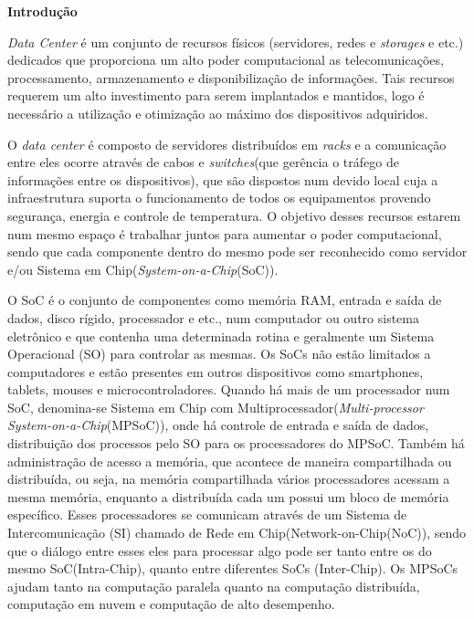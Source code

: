 \documentclass[a4paper,12pt]{article}
\begin{document}
\begin{center}
\textbf{{\LARGE Introdução}} \\ \vspace{0.5cm}
\end{center}

\textit{Data Center} é um conjunto de recursos físicos (servidores, redes e \textit{storages} e etc.) dedicados que proporciona um alto poder computacional as telecomunicações, processamento, armazenamento e disponibilização de informações. Tais recursos requerem um alto investimento para serem implantados e mantidos, logo é necessário a utilização e otimização ao máximo dos dispositivos adquiridos.

O \textit{data center} é composto de servidores distribuídos em \textit{racks} e a comunicação entre eles ocorre através de cabos e \textit{switches}(que gerência o tráfego de informações entre os dispositivos), que são dispostos num devido local cuja a infraestrutura suporta o funcionamento de todos os equipamentos provendo segurança, energia e controle de temperatura. O objetivo desses recursos estarem num mesmo espaço é trabalhar juntos para aumentar o poder computacional, sendo que cada componente dentro do mesmo pode ser reconhecido como servidor e/ou Sistema em Chip(\textit{System-on-a-Chip}(SoC)).

O SoC é o conjunto de componentes como memória RAM, entrada e saída de dados, disco rígido, processador e etc., num computador ou outro sistema eletrônico e que contenha uma determinada rotina e geralmente um Sistema Operacional (SO) para controlar as mesmas. Os SoCs não estão limitados a computadores e estão presentes em outros dispositivos como smartphones, tablets, mouses e microcontroladores. Quando há mais de um processador num SoC, denomina-se Sistema em Chip com Multiprocessador(\textit{Multi-processor System-on-a-Chip}(MPSoC)), onde há controle de entrada e saída de dados, distribuição dos processos pelo SO para os processadores do MPSoC. Também há administração de acesso a memória, que acontece de maneira compartilhada ou distribuída, ou seja, na memória compartilhada vários processadores acessam a mesma memória, enquanto a distribuída cada um possui um bloco de memória específico. Esses processadores se comunicam através de um Sistema de Intercomunicação (SI) chamado de Rede em Chip(Network-on-Chip(NoC)), sendo que o diálogo entre esses eles para processar algo pode ser tanto entre os do mesmo SoC(Intra-Chip), quanto entre diferentes SoCs (Inter-Chip). Os MPSoCs ajudam tanto na computação paralela quanto na computação distribuída, computação em nuvem e computação de alto desempenho.
\end{document}
